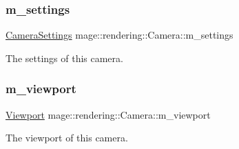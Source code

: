 \subsubsection{\texorpdfstring{m\+\_\+settings}{m\_settings}}
{\footnotesize\ttfamily \hyperlink{classmage_1_1rendering_1_1_camera_settings}{Camera\+Settings} mage\+::rendering\+::\+Camera\+::m\+\_\+settings\hspace{0.3cm}{\ttfamily [private]}}

The settings of this camera. \hypertarget{classmage_1_1rendering_1_1_camera_af01065cfadb5c8442bcc0f823254b09e}{}\label{classmage_1_1rendering_1_1_camera_af01065cfadb5c8442bcc0f823254b09e} 
\subsubsection{\texorpdfstring{m\+\_\+viewport}{m\_viewport}}
{\footnotesize\ttfamily \hyperlink{classmage_1_1rendering_1_1_viewport}{Viewport} mage\+::rendering\+::\+Camera\+::m\+\_\+viewport\hspace{0.3cm}{\ttfamily [private]}}

The viewport of this camera. 